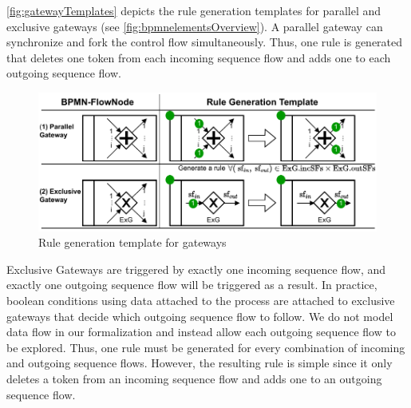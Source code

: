 \documentclass{lmcs} %
\begin{document}
\autoref{fig:gatewayTemplates} depicts the rule generation templates for parallel and exclusive gateways (see \autoref{fig:bpmnelementsOverview}).
A parallel gateway can synchronize and fork the control flow simultaneously.
Thus, one rule is generated that deletes one token from each incoming sequence flow and adds one to each outgoing sequence flow.

\begin{figure}[ht]
    \centering
    \includegraphics[width=1\textwidth]{images/gateways_template.pdf}
    \caption{Rule generation template for gateways}
    \label{fig:gatewayTemplates}
\end{figure}

Exclusive Gateways are triggered by exactly one incoming sequence flow, and exactly one outgoing sequence flow will be triggered as a result.
In practice, boolean conditions using data attached to the process are attached to exclusive gateways that decide which outgoing sequence flow to follow.
We do not model data flow in our formalization and instead allow each outgoing sequence flow to be explored. 
Thus, one rule must be generated for every combination of incoming and outgoing sequence flows.
However, the resulting rule is simple since it only deletes a token from an incoming sequence flow and adds one to an outgoing sequence flow.
\end{document}
